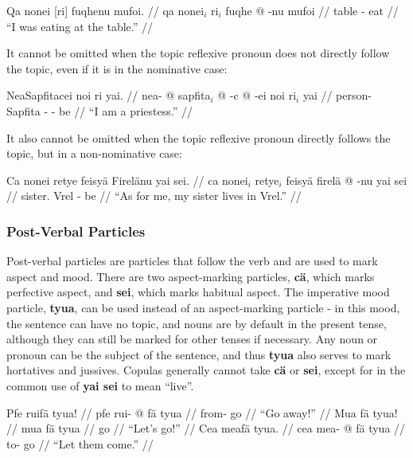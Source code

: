 \documentclass{article}
\begin{document}
\ex[lingstyle=QuCheanya] \begingl
\glpreamble Qa nonei [ri] fuqhenu mufoi. //
\gla qa nonei$_i$ ri$_i$ fuqhe @ -nu mufoi //
\glb {}   table - eat //
\glft ``I was eating at the table.'' //
\endgl \xe

It cannot be omitted when the topic reflexive pronoun does not directly follow the topic, even if it is in the nominative case:

\ex[lingstyle=QuCheanya] \begingl
\glpreamble NeaSapfitacei noi ri yai. //
\gla nea- @ sapfita$_i$ @ -c @ -ei noi ri$_i$ yai //
\glb person- Sapfita - -   be //
\glft ``I am a priestess.'' //
\endgl \xe

It also cannot be omitted when the topic reflexive pronoun directly follows the topic, but in a non-nominative case:

\ex[lingstyle=QuCheanya] \begingl
\glpreamble Ca nonei retye feisy\"a Firel\"anu yai sei. //
\gla ca nonei$_i$ retye$_i$ feisy\"a firel\"a @ -nu yai sei //
\glb {}   sister. Vrel - be  //
\glft ``As for me, my sister lives in Vrel.'' //
\endgl \xe

\subsubsection{Post-Verbal Particles}
\label{postverbalparts}

Post-verbal particles are particles that follow the verb and are used to mark aspect and mood.  There are two aspect-marking particles, \textbf{c\"a}, which marks perfective aspect, and \textbf{sei}, which marks habitual aspect.  The imperative mood particle, \textbf{tyua}, can be used instead of an aspect-marking particle - in this mood, the sentence can have no topic, and nouns are by default in the present tense, although they can still be marked for other tenses if necessary.  Any noun or pronoun can be the subject of the sentence, and thus \textbf{tyua} also serves to mark hortatives and jussives.  Copulas generally cannot take \textbf{c\"a} or \textbf{sei}, except for in the common use of \textbf{yai sei} to mean ``live''.

\pex[lingstyle=QuCheanya] 
\a
\begingl
\glpreamble Pfe ruif\"a tyua! //
\gla pfe rui- @ f\"a tyua //
\glb {} from- go  //
\glft ``Go away!'' //
\endgl
\a
\begingl
\glpreamble Mua f\"a tyua! //
\gla mua f\"a tyua //
\glb {} go  //
\glft ``Let's go!'' //
\endgl
\a
\begingl
\glpreamble Cea meaf\"a tyua. //
\gla cea mea- @ f\"a tyua //
\glb {} to- go  //
\glft ``Let them come.'' //
\endgl
\xe
\end{document}
